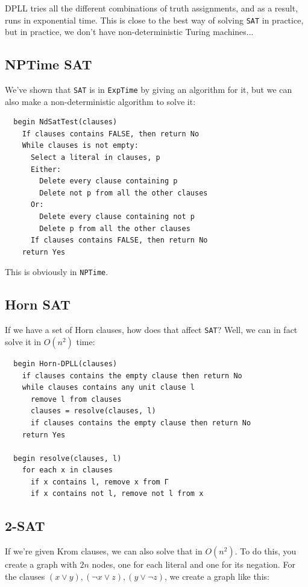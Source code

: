 DPLL tries all the different combinations of truth assignments, and as a result,
runs in exponential time. This is close to the best way of solving \texttt{SAT}
in practice, but in practice, we don't have non-deterministic Turing machines...

\subsection{NPTime SAT}

We've shown that \texttt{SAT} is in \texttt{ExpTime} by giving an algorithm for
it, but we can also make a non-deterministic algorithm to solve it:

\begin{verbatim}
  begin NdSatTest(clauses)
    If clauses contains FALSE, then return No
    While clauses is not empty:
      Select a literal in clauses, p
      Either:
        Delete every clause containing p
        Delete not p from all the other clauses
      Or:
        Delete every clause containing not p
        Delete p from all the other clauses
      If clauses contains FALSE, then return No
    return Yes
\end{verbatim}

This is obviously in \texttt{NPTime}.

\subsection{Horn SAT}

If we have a set of Horn clauses, how does that affect \texttt{SAT}? Well, we
can in fact solve it in $O(n^2)$ time:

\begin{verbatim}
  begin Horn-DPLL(clauses)
    if clauses contains the empty clause then return No
    while clauses contains any unit clause l
      remove l from clauses
      clauses = resolve(clauses, l)
      if clauses contains the empty clause then return No
    return Yes

  begin resolve(clauses, l)
    for each x in clauses
      if x contains l, remove x from Γ
      if x contains not l, remove not l from x
\end{verbatim}

\subsection{2-SAT}

If we're given Krom clauses, we can also solve that in $O(n^2)$. To do this, you
create a graph with $2n$ nodes, one for each literal and one for its negation.
For the clauses $(x \vee y), (\neg x \vee z), (y \vee \neg z)$, we create a
graph like this:


